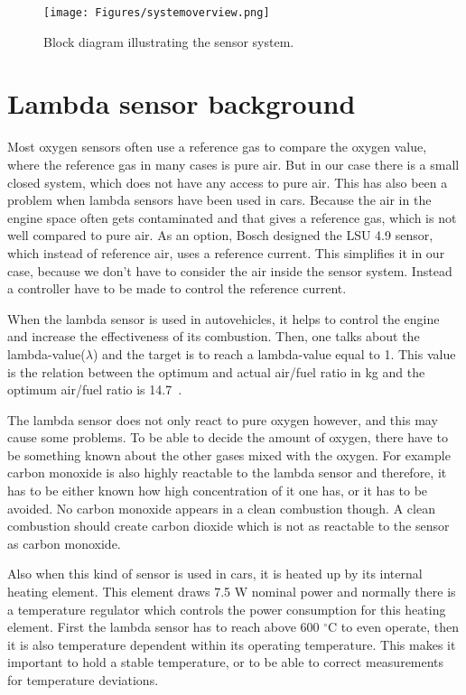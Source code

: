 \begin{figure}
    \centering
    \texttt{[image: Figures/systemoverview.png]}
    \caption{Block diagram illustrating the sensor system.}
    \label{fig:systemoverview}
\end{figure}


\section{Lambda sensor background}

Most oxygen sensors often use a reference gas to compare the oxygen value, where the reference gas in many cases is pure air. But in our case there is a small closed system, which does not have any access to pure air. This has also been a problem when lambda sensors have been used in cars. Because the air in the engine space often gets contaminated and that gives a reference gas, which is not well compared to pure air. As an option, Bosch designed the LSU 4.9 sensor, which instead of reference air, uses a reference current. This simplifies it in our case, because we don't have to consider the air inside the sensor system. Instead a controller have to be made to control the reference current.


When the lambda sensor is used in autovehicles, it helps to control the engine and increase the effectiveness of its combustion. Then, one talks about the lambda-value($\lambda$) and the target is to reach a lambda-value equal to 1. This value is the relation between the optimum and actual air/fuel ratio in kg and the optimum air/fuel ratio is 14.7~\cite{BOSCH}.


The lambda sensor does not only react to pure oxygen however, and this may cause some problems. To be able to decide the amount of oxygen, there have to be something known about the other gases mixed with the oxygen. For example carbon monoxide is also highly reactable to the lambda sensor and therefore, it has to be either known how high concentration of it one has, or it has to be avoided. No carbon monoxide appears in a clean combustion though. A clean combustion should create carbon dioxide which is not as reactable to the sensor as carbon monoxide.

Also when this kind of sensor is used in cars, it is heated up by its internal heating element. This element draws 7.5 W nominal power and normally there is a temperature regulator which controls the power consumption for this heating element. First the lambda sensor has to reach above 600 $^\circ$C to even operate, then it is also temperature dependent within its operating temperature. This makes it important to hold a stable temperature, or to be able to correct measurements for temperature deviations.





